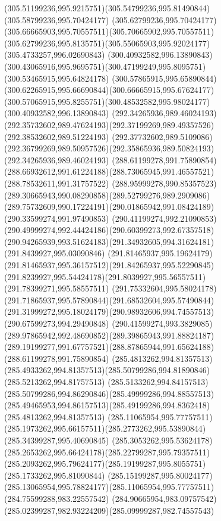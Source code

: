 {{\curveto(305.51199236,995.9215751)(305.54799236,995.81490844)(305.58799236,995.70424177)
\curveto(305.62799236,995.70424177)(305.66665903,995.70557511)(305.70665902,995.70557511)
\curveto(305.62799236,995.8135751)(305.55065903,995.92024177)(305.4733257,996.02690843)
\moveto(300.40932582,996.13890843)
\curveto(300.43065916,995.9695751)(300.47199249,995.8095751)(300.53465915,995.64824178)
\curveto(300.57865915,995.65890844)(300.62265915,995.66690844)(300.66665915,995.67624177)
\curveto(300.57065915,995.8255751)(300.48532582,995.98024177)(300.40932582,996.13890843)
\moveto(292.34265936,989.46024193)
\curveto(292.35732602,989.47624193)(292.37199269,989.49357526)(292.38532602,989.51224193)
\curveto(292.37732602,989.5109086)(292.36799269,989.50957526)(292.35865936,989.50824193)
\lineto(292.34265936,989.46024193)
\moveto(288.61199278,991.75890854)
\curveto(288.66932612,991.61224188)(288.73065945,991.46557521)(288.78532611,991.31757522)
\curveto(288.95999278,990.85357523)(289.30665943,990.08290858)(289.52799276,989.2909086)
\curveto(289.75732609,990.17224191)(290.01865942,991.08424189)(290.33599274,991.97490853)
\curveto(290.41199274,992.21090853)(290.49999274,992.44424186)(290.60399273,992.67357518)
\curveto(290.94265939,993.51624183)(291.34932605,994.31624181)(291.8439927,995.03090846)
\curveto(291.81465937,995.19624179)(291.81465937,995.36157512)(291.84265937,995.52290845)
\curveto(291.8239927,995.54424178)(291.8039927,995.56557511)(291.78399271,995.58557511)
\curveto(291.75332604,995.58024178)(291.71865937,995.57890844)(291.68532604,995.57490844)
\curveto(291.31999272,995.18024179)(290.98932606,994.74557513)(290.67599273,994.29490848)
\curveto(290.41599274,993.3829085)(289.97865942,992.48690852)(289.39865943,991.88824187)
\curveto(289.19199277,991.67757521)(288.87865944,991.65624188)(288.61199278,991.75890854)
\moveto(285.4813262,994.81357513)
\curveto(285.4933262,994.81357513)(285.50799286,994.81890846)(285.5213262,994.81757513)
\curveto(285.5133262,994.84157513)(285.50799286,994.86290846)(285.49999286,994.88557513)
\curveto(285.49465953,994.86157513)(285.49199286,994.8362418)(285.4813262,994.81357513)
\moveto(285.11065954,995.77757511)
\curveto(285.1973262,995.66157511)(285.2773262,995.53890844)(285.34399287,995.40690845)
\curveto(285.3053262,995.53624178)(285.2653262,995.66424178)(285.22799287,995.79357511)
\curveto(285.2093262,995.79624177)(285.19199287,995.8055751)(285.1733262,995.81090844)
\curveto(285.15199287,995.80024177)(285.13065954,995.78824177)(285.11065954,995.77757511)
\moveto(284.75599288,983.22557542)
\curveto(284.90665954,983.09757542)(285.02399287,982.93224209)(285.09999287,982.74557543)
}}
